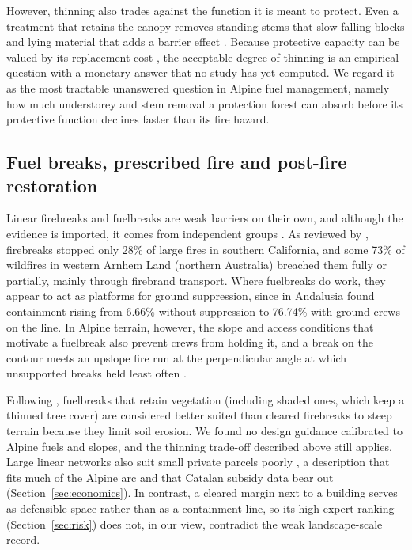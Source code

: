 \documentclass[11pt,a4paper]{article}
\begin{document}
However, thinning also trades against the function it is meant to protect. Even a treatment that retains the canopy removes standing stems that slow falling blocks \citep{moos_climate_2021} and lying material that adds a barrier effect \citep{costa_biological_2021}. Because protective capacity can be valued by its replacement cost \citep{accastello_asforesee_2019}, the acceptable degree of thinning is an empirical question with a monetary answer that no study has yet computed. We regard it as the most tractable unanswered question in Alpine fuel management, namely how much understorey and stem removal a protection forest can absorb before its protective function declines faster than its fire hazard.

\subsection{Fuel breaks, prescribed fire and post-fire restoration}
\label{sec:fuelbreaks}

Linear firebreaks and fuelbreaks are weak barriers on their own, and although the evidence is imported, it comes from independent groups \citep{zong_effectiveness_2026, ortega_modeling_2024, ascoli_firebreak_2018}. As reviewed by \citet{zong_effectiveness_2026}, firebreaks stopped only 28\% of large fires in southern California, and some 73\% of wildfires in western Arnhem Land (northern Australia) breached them fully or partially, mainly through firebrand transport. Where fuelbreaks do work, they appear to act as platforms for ground suppression, since in Andalusia \citet{ortega_modeling_2024} found containment rising from 6.66\% without suppression to 76.74\% with ground crews on the line. In Alpine terrain, however, the slope and access conditions that motivate a fuelbreak also prevent crews from holding it, and a break on the contour meets an upslope fire run \citep{conedera_linking_2024} at the perpendicular angle at which unsupported breaks held least often \citep{ortega_modeling_2024}.

Following \citet{ascoli_firebreak_2018}, fuelbreaks that retain vegetation (including shaded ones, which keep a thinned tree cover) are considered better suited than cleared firebreaks to steep terrain because they limit soil erosion. We found no design guidance calibrated to Alpine fuels and slopes, and the thinning trade-off described above still applies. Large linear networks also suit small private parcels poorly \citep{ascoli_firebreak_2018}, a description that fits much of the Alpine arc and that Catalan subsidy data bear out (Section~\ref{sec:economics}). In contrast, a cleared margin next to a building serves as defensible space rather than as a containment line, so its high expert ranking (Section~\ref{sec:risk}) does not, in our view, contradict the weak landscape-scale record.
\end{document}
